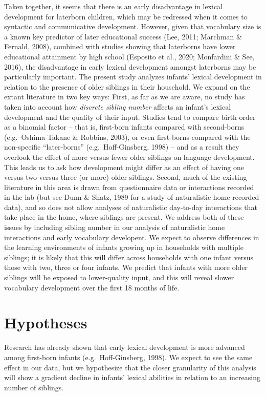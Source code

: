 \documentclass[
  english,
  man,floatsintext]{apa6}
\begin{document}
Taken together, it seems that there is an early disadvantage in lexical development for laterborn children, which may be redressed when it comes to syntactic and communicative development. However, given that vocabulary size is a known key predictor of later educational success (Lee, 2011; Marchman \& Fernald, 2008), combined with studies showing that laterborns have lower educational attainment by high school (Esposito et al., 2020; Monfardini \& See, 2016), the disadvantage in early lexical development amongst laterborns may be particularly important. The present study analyzes infants' lexical development in relation to the presence of older siblings in their household. We expand on the extant literature in two key ways: First, as far as we are aware, no study has taken into account how \emph{discrete sibling number} affects an infant's lexical development and the quality of their input. Studies tend to compare birth order as a binomial factor -- that is, first-born infants compared with second-borns (e.g.~Oshima-Takane \& Robbins, 2003), or even first-borns compared with the non-specific \enquote{later-borns} (e.g.~Hoff-Ginsberg, 1998) -- and as a result they overlook the effect of more versus fewer older siblings on language development. This leads us to ask how development might differ as an effect of having one versus two versus three (or more) older siblings. Second, much of the existing literature in this area is drawn from questionnaire data or interactions recorded in the lab (but see Dunn \& Shatz, 1989 for a study of naturalistic home-recorded data), and so does not allow analyses of naturalistic day-to-day interactions that take place in the home, where siblings are present. We address both of these issues by including sibling number in our analysis of naturalistic home interactions and early vocabulary developent. We expect to observe differences in the learning environments of infants growing up in households with multiple siblings; it is likely that this will differ across households with one infant versus those with two, three or four infants. We predict that infants with more older siblings will be exposed to lower-quality input, and this will reveal slower vocabulary development over the first 18 months of life.

\hypertarget{hypotheses}{%
\section{Hypotheses}\label{hypotheses}}

Research has already shown that early lexical development is more advanced among first-born infants (e.g.~Hoff-Ginsberg, 1998). We expect to see the same effect in our data, but we hypothesize that the closer granularity of this analysis will show a gradient decline in infants' lexical abilities in relation to an increasing number of siblings.
\end{document}
